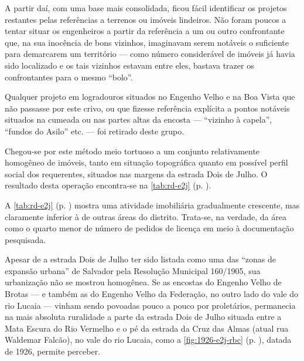 A partir daí, com uma base mais consolidada, ficou fácil identificar os projetos restantes pelas referências a terrenos ou imóveis lindeiros. Não foram poucos a tentar situar os engenheiros a partir da referência a um ou outro confrontante que, na sua inocência de bons vizinhos, imaginavam serem notáveis o suficiente para demarcarem um território --- como número considerável de imóveis já havia sido localizado e os tais vizinhos estavam entre eles, bastava trazer os confrontantes para o mesmo ``bolo''. 

Qualquer projeto em logradouros situados no Engenho Velho e na Boa Vista que não passasse por este crivo, ou que fizesse referência explícita a pontos notáveis situados na cumeada ou nas partes altas da encosta --- ``vizinho à capela'', ``fundos do Asilo'' etc. --- foi retirado deste grupo. 

Chegou-se por este método meio tortuoso a um conjunto relativamente homogêneo de imóveis, tanto em situação topográfica quanto em possível perfil social dos requerentes, situados nas margens da estrada Dois de Julho. O resultado desta operação encontra-se na \autoref{tab:rd-e2j} (p. \pageref{tab:rd-e2j}).





A \autoref{tab:rd-e2j} (p. \pageref{tab:rd-e2j}) mostra uma atividade imobiliária gradualmente crescente, mas claramente inferior à de outras áreas do distrito. Trata-se, na verdade, da área como o quarto menor de número de pedidos de licença em meio à documentação pesquisada. 

Apesar de a estrada Dois de Julho ter sido listada como uma das ``zonas de expansão urbana'' de Salvador pela Resolução Municipal 160/1905, sua urbanização não se mostrou homogênea. Se as encostas do Engenho Velho de Brotas --- e também as do Engenho Velho da Federação, no outro lado do vale do rio Lucaia --- vinham sendo povoadas pouco a pouco por proletários, permanecia na mais absoluta ruralidade a parte da estrada Dois de Julho situada entre a Mata Escura do Rio Vermelho e o pé da estrada da Cruz das Almas (atual rua Waldemar Falcão), no vale do rio Lucaia, como a \autoref{fig:1926-e2j-rbc} (p. \pageref{fig:1926-e2j-rbc}), datada de 1926, permite perceber. 


